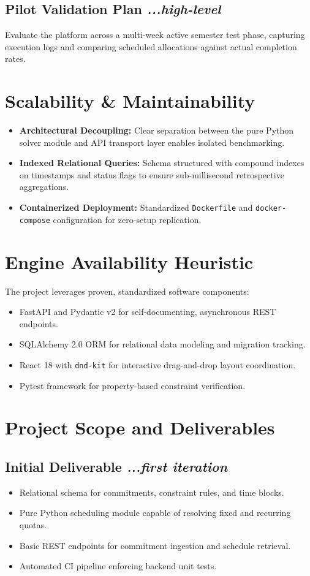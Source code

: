 \documentclass[11pt,a4paper]{article}
\begin{document}
\subsection{Pilot Validation Plan \textit{...high-level}}
Evaluate the platform across a multi-week active semester test phase, capturing execution logs and comparing scheduled allocations against actual completion rates.

\section{Scalability \& Maintainability}
\begin{itemize}
    \item \textbf{Architectural Decoupling:} Clear separation between the pure Python solver module and API transport layer enables isolated benchmarking.
    \item \textbf{Indexed Relational Queries:} Schema structured with compound indexes on timestamps and status flags to ensure sub-millisecond retrospective aggregations.
    \item \textbf{Containerized Deployment:} Standardized \texttt{Dockerfile} and \texttt{docker-compose} configuration for zero-setup replication.
\end{itemize}

\section{Engine Availability Heuristic}
The project leverages proven, standardized software components:
\begin{itemize}
    \item FastAPI and Pydantic v2 for self-documenting, asynchronous REST endpoints.
    \item SQLAlchemy 2.0 ORM for relational data modeling and migration tracking.
    \item React 18 with \texttt{dnd-kit} for interactive drag-and-drop layout coordination.
    \item Pytest framework for property-based constraint verification.
\end{itemize}

\section{Project Scope and Deliverables}
\subsection{Initial Deliverable \textit{...first iteration}}
\begin{itemize}
    \item Relational schema for commitments, constraint rules, and time blocks.
    \item Pure Python scheduling module capable of resolving fixed and recurring quotas.
    \item Basic REST endpoints for commitment ingestion and schedule retrieval.
    \item Automated CI pipeline enforcing backend unit tests.
\end{itemize}
\end{document}
